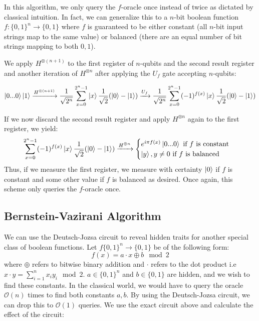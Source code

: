 In this algorithm, we only query the $f$-oracle once instead of twice as dictated by classical intuition. In fact, we can generalize this to a $n$-bit boolean function $f:\{0,1\}^n \rightarrow \{0,1\}$ where $f$ is guaranteed to be either constant (all $n$-bit input strings map to the same value) or balanced (there are an equal number of bit strings mapping to both $0,1$).

We apply $H^{\otimes (n+1)}$ to the first register of $n$-qubits and the second result register and another iteration of $H^{\otimes n}$ after applying the $U_f$ gate accepting $n$-qubits:

\begin{gather}
\ket{0...0}\ket{1} \xrightarrow{H^{\otimes (n+1)}} \frac{1}{\sqrt{2^n}} \sum_{x = 0}^{2^n -1} \ket{x}\frac{1}{\sqrt{2}}(\ket{0}-\ket{1}) \xrightarrow{U_f} \frac{1}{\sqrt{2^n}} \sum_{x = 0}^{2^n -1} (-1)^{f(x)}\ket{x}\frac{1}{\sqrt{2}}(\ket{0}-\ket{1})
\end{gather}

If we now discard the second result register and apply $H^{\otimes n}$ again to the first register, we yield:
$$\sum_{x = 0}^{2^n -1} (-1)^{f(x)}\ket{x}\frac{1}{\sqrt{2}}(\ket{0}-\ket{1}) \xrightarrow{H^{\otimes n}} \begin{cases} e^{i\pi
f(x)}\ket{0...0} \text{ if $f$ is constant} \\
\ket{y}, y \neq 0 \text{ if $f$ is balanced}
\end{cases}$$
Thus, if we measure the first register, we measure with certainty $\ket{0}$ if $f$ is constant and some other value if $f$ is balanced as desired. Once again, this scheme only queries the $f$-oracle once.

\subsection{Bernstein-Vazirani Algorithm}
We can use the Deutsch-Jozsa circuit to reveal hidden traits for another special class of boolean functions. Let $f\{0,1\}^n \rightarrow \{0,1\}$ be of the following form:
$$f(x) = a\cdot x \oplus b \mod 2$$ where $\oplus$ refers to bitwise binary addition and $\cdot$ refers to the dot product i.e $x \cdot y = \sum_{i=1}^n x_iy_i \mod 2$. $a \in \{0,1\}^n$ and $b \in \{0,1\}$ are hidden, and we wish to find these constants. In the classical world, we would have to query the oracle $\mathcal{O}(n)$ times to find both constants $a,b$. By using the Deutsch-Jozsa circuit, we can drop this to $\mathcal{O}(1)$ queries. We use the exact circuit above and calculate the effect of the circuit:


